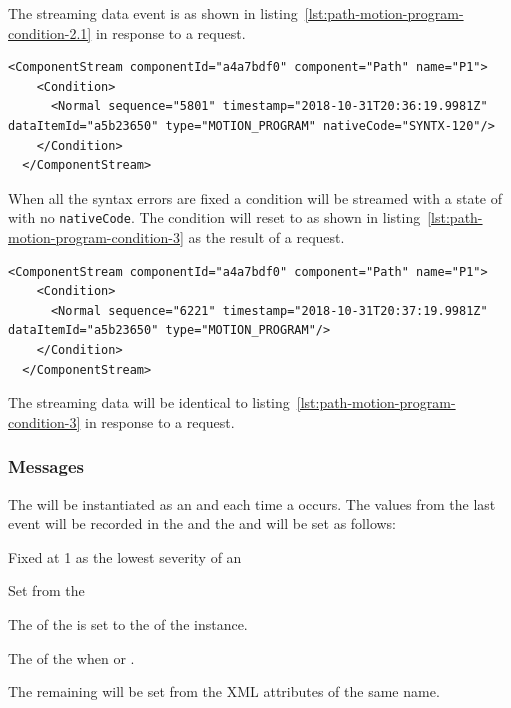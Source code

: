 The streaming data event is as shown in listing~\ref{lst:path-motion-program-condition-2.1} in response to a  request.

\begin{lstlisting}[firstnumber=last,escapechar=|,%
    caption={Path Motion Program Syntax Error on Line 120 Normal},label={lst:path-motion-program-condition-2.1}]
  <ComponentStream componentId="a4a7bdf0" component="Path" name="P1">
    <Condition>
      <Normal sequence="5801" timestamp="2018-10-31T20:36:19.9981Z" dataItemId="a5b23650" type="MOTION_PROGRAM" nativeCode="SYNTX-120"/>
    </Condition>
  </ComponentStream>
\end{lstlisting}


When all the syntax errors are fixed a condition will be streamed with a state of  with no \texttt{nativeCode}. The condition will reset to  as shown in listing~\ref{lst:path-motion-program-condition-3} as the result of a  request.

\begin{lstlisting}[firstnumber=last,escapechar=|,%
    caption={Path Motion Program Normal},label={lst:path-motion-program-condition-3}]
  <ComponentStream componentId="a4a7bdf0" component="Path" name="P1">
    <Condition>
      <Normal sequence="6221" timestamp="2018-10-31T20:37:19.9981Z" dataItemId="a5b23650" type="MOTION_PROGRAM"/>
    </Condition>
  </ComponentStream>
\end{lstlisting}

The streaming data will be identical to listing~\ref{lst:path-motion-program-condition-3} in response to a  request.

\subsubsection{Messages}

The  will be instantiated as an  and each time a  occurs. The values from the last event will be recorded in the  and the   and  will be set as follows: 

\begin{description}[font=\it\bfseries,labelindent=4em,labelwidth=6em,leftmargin=!]    
  \item[Severity] Fixed at 1 as the lowest severity of an 
  \item[Message] Set from the 
  \item[Time] 
  \item[NodeId] The  of the  is set to the  of the   instance.
  \item[Message] The  of the  when  or .
  \item[\ldots] The remaining  will be set from the XML attributes of the same name.
\end{description}

